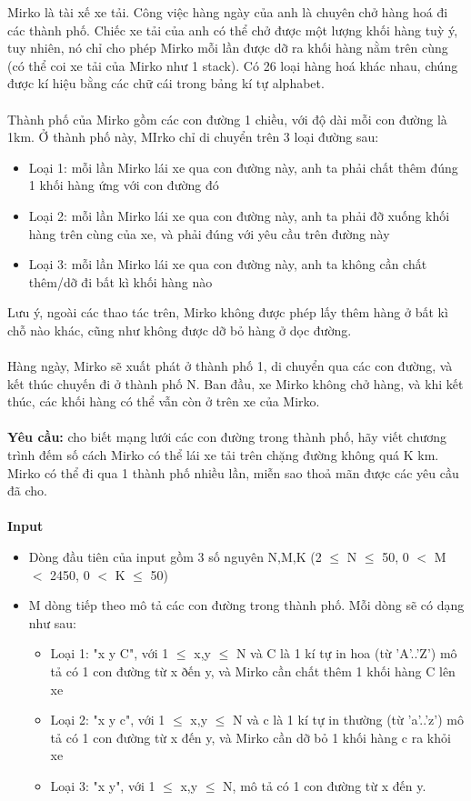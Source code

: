 

Mirko là tài xế xe tải. Công việc hàng ngày của anh là chuyên chở hàng hoá đi các thành phố. Chiếc xe tải của anh có thể chở được một lượng khối hàng tuỳ ý, tuy nhiên, nó chỉ cho phép Mirko mỗi lần được dỡ ra khối hàng nằm trên cùng (có thể coi xe tải của Mirko như 1 stack). Có 26 loại hàng hoá khác nhau, chúng được kí hiệu bằng các chữ cái trong bảng kí tự alphabet.
\\
\\Thành phố của Mirko gồm các con đường 1 chiều, với độ dài mỗi con đường là 1km. Ở thành phố này, MIrko chỉ di chuyển trên 3 loại đường sau:
\begin{itemize}
	\item Loại 1: mỗi lần Mirko lái xe qua con đường này, anh ta phải chất thêm đúng 1 khối hàng ứng với con đường đó
	\item Loại 2: mỗi lần Mirko lái xe qua con đường này, anh ta phải đỡ xuống khối hàng trên cùng của xe, và phải đúng với yêu cầu trên đường này
	\item Loại 3: mỗi lần Mirko lái xe qua con đường này, anh ta không cần chất thêm/dỡ đi bất kì khối hàng nào
\end{itemize}

Lưu ý, ngoài các thao tác trên, Mirko không được phép lấy thêm hàng ở bất kì chỗ nào khác, cũng như không được dỡ bỏ hàng ở dọc đường.
\\
\\Hàng ngày, Mirko sẽ xuất phát ở thành phố 1, di chuyển qua các con đường, và kết thúc chuyến đi ở thành phố N. Ban đầu, xe Mirko không chở hàng, và khi kết thúc, các khối hàng có thể vẫn còn ở trên xe của Mirko.
\\
\\\textbf{Yêu cầu:} cho biết mạng lưới các con đường trong thành phố, hãy viết chương trình đếm số cách Mirko có thể lái xe tải trên chặng đường không quá K km. Mirko có thể đi qua 1 thành phố nhiều lần, miễn sao thoả mãn được các yêu cầu đã cho.
\\
\\\textbf{Input}
\begin{itemize}
	\item Dòng đầu tiên của input gồm 3 số nguyên N,M,K (2  $\le$  N  $\le$  50, 0 $<$ M $<$ 2450, 0 $<$ K  $\le$  50)
	\item M dòng tiếp theo mô tả các con đường trong thành phố. Mỗi dòng sẽ có dạng như sau:
\begin{itemize}
	\item Loại 1: "x y C", với 1  $\le$  x,y  $\le$  N và C là 1 kí tự in hoa (từ 'A'..'Z') mô tả có 1 con đường từ x ðến y, và Mirko cần chất thêm 1 khối hàng C lên xe
	\item Loại 2: "x y c", với 1  $\le$  x,y  $\le$  N và c là 1 kí tự in thường (từ 'a'..'z') mô tả có 1 con đường từ x đến y, và Mirko cần dỡ bỏ 1 khối hàng c ra khỏi xe
	\item Loại 3: "x y", với 1  $\le$  x,y  $\le$  N, mô tả có 1 con đường từ x đến y.
\end{itemize}
\end{itemize}

